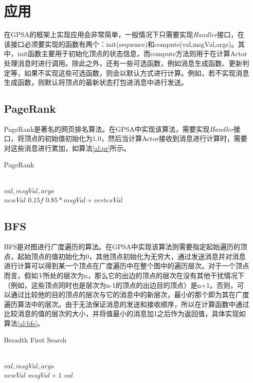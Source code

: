 \section{应用}
在GPSA的框架上实现应用会非常简单，一般情况下只需要实现\textit{Handler}接口，在该接口必须要实现的函数有两个：\textnormal{init(sequence)}和\textnormal{compute(val,msgVal,args)}。其中，\textnormal{init}函数主要用于初始化顶点的状态信息，而compute方法则用于在计算Actor处理消息时进行调用。除此之外，还有一些可选函数，例如消息生成函数、更新判定等，如果不实现这些可选函数，则会以默认方式进行计算。例如，若不实现消息生成函数，则默认将顶点的最新状态打包进消息中进行发送。

\subsection{PageRank}
PageRank是著名的网页排名算法。在GPSA中实现该算法，需要实现\textit{Handler}接口，将顶点的初始值初始化为1.0，然后当计算Actor接收到消息进行计算时，需要对这些消息进行累加，如算法\ref{al:pr}所示。
\begin{algorithm}
{
{
\renewcommand\baselinestretch{1.5}\selectfont %

\caption{PageRank}
\label{al:pr}
\begin{algorithmic}[1]
\REQUIRE ~\\
	$val,msgVal,args$
\ENSURE ~\\
	$newVal$
	 \RETURN $ 0.15f$
\ENDIF
\RETURN $0.85*msgVal + vertexVal$

\end{algorithmic}
}
\par}
\end{algorithm}

\subsection{BFS}
BFS是对图进行广度遍历的算法。在GPSA中实现该算法则需要指定起始遍历的顶点，起始顶点的值初始化为0，其他顶点初始化为无穷大，通过发送消息并对消息进行计算可以得到某一个顶点在广度遍历中在整个图中的遍历层次。对于一个顶点而言，假如\textit{V}所处的层次为n，那么它的出边的顶点的层次在没有其他干扰情况下（例如，这些顶点同时也是层次为n-1的顶点的出边目的顶点）是n+1。否则，可以通过比较他的目的顶点的层次与它的消息中的新层次，最小的那个即为其在广度遍历算法中的层次。由于无法保证消息的发送和接收顺序，所以在计算函数中通过比较消息的值的层次的大小，并将值最小的消息加1之后作为返回值，具体实现如算法\ref{al:bfs}。
\begin{algorithm}
{
{
\renewcommand\baselinestretch{1.5}\selectfont %

\caption{Breadth First Search}
\label{al:bfs}
\begin{algorithmic}[1]
\REQUIRE ~\\
	$val,msgVal,args$
\ENSURE ~\\
	$newVal$
	 \RETURN $ msgVal + 1$
\ENDIF
\RETURN $val$

\end{algorithmic}
}
\par}
\end{algorithm}
